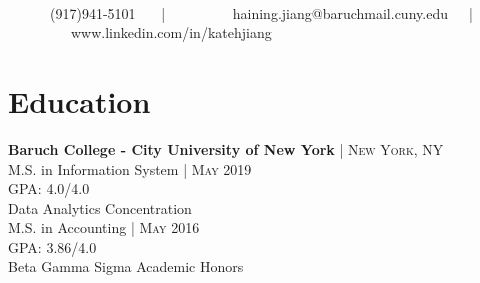 \documentclass[10pt]{article} %
\begin{document}
\color{text1} %


\par{\\[0.5\baselineskip] %


{\ \ \ \faMobilePhone \ \ \  (917)941-5101 \ \ \ | \ \ \  
\  \ \ \faEnvelope \ \ \ haining.jiang@baruchmail.cuny.edu\ \ \ | \ \ \
\  \ \ \faLinkedin \ \ \ www.linkedin.com/in/katehjiang }
	

\begin{minipage}[t]{0.5\textwidth} %
\vspace{0pt} %
	


\section{Education} 


\textbf{Baruch College - City University of New York} {\hfill\footnotesize\textsc{| New York, NY}}\\
M.S. in Information System {\hfill\footnotesize\textsc{| May 2019}}\\ 
GPA: 4.0/4.0\\
Data Analytics Concentration \\
M.S. in Accounting {\hfill\footnotesize\textsc{| May 2016}}\\ 
GPA: 3.86/4.0\\
Beta Gamma Sigma Academic Honors


\end{minipage}}
\end{document}
